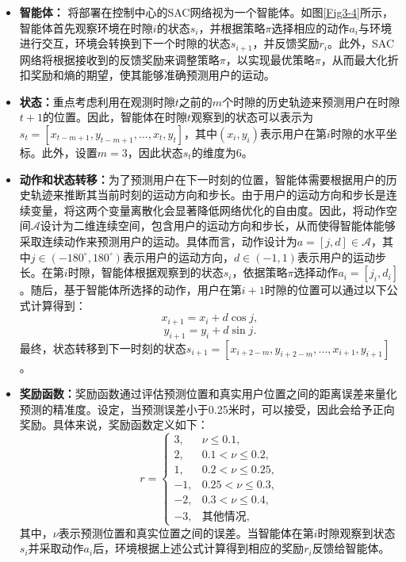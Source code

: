 \documentclass{article}
\begin{document}
\begin{itemize} 
	\item \textbf{智能体：}  将部署在控制中心的SAC网络视为一个智能体。如图\ref{Fig3-4}所示，智能体首先观察环境在时隙$i$的状态$s_i$，并根据策略$\pi$选择相应的动作$a_i$与环境进行交互，环境会转换到下一个时隙的状态$s_{i+1}$，并反馈奖励$r_i$。此外，SAC网络将根据接收到的反馈奖励来调整策略$\pi$，以实现最优策略$\pi$，从而最大化折扣奖励和熵的期望，使其能够准确预测用户的运动。
	\item \textbf{状态：}重点考虑利用在观测时隙$t$之前的$m$个时隙的历史轨迹来预测用户在时隙$t+1$的位置。因此，智能体在时隙$t$观察到的状态可以表示为$s_t = \left[x_{t-m+1}, y_{t-m+1}, \dots, x_t, y_t \right]$，其中$(x_i, y_i)$表示用户在第$i$时隙的水平坐标。此外，设置$m = 3$，因此状态$s_t$的维度为6。
	\item \textbf{动作和状态转移：}为了预测用户在下一时刻的位置，智能体需要根据用户的历史轨迹来推断其当前时刻的运动方向和步长。由于用户的运动方向和步长是连续变量，将这两个变量离散化会显著降低网络优化的自由度。因此，将动作空间$\mathcal{A}$设计为二维连续空间，包含用户的运动方向和步长，从而使得智能体能够采取连续动作来预测用户的运动。具体而言，动作设计为$a = \left[j, d\right] \in \mathcal{A}$，其中$j \in \left(-180^{\circ}, 180^{\circ}\right)$表示用户的运动方向，$d \in \left(-1, 1\right)$表示用户的运动步长。在第$i$时隙，智能体根据观察到的状态$s_i$，依据策略$\pi$选择动作$a_i = \left[j_i, d_i\right]$。随后，基于智能体所选择的动作，用户在第$i+1$时隙的位置可以通过以下公式计算得到：
	\begin{equation}\label{eq11}
		x_{i+1} = x_i+d\cos{j},   
	\end{equation}
	\begin{equation}\label{eq12}
		y_{i+1} = y_i+d\sin{j}.
	\end{equation}
	最终，状态转移到下一时刻的状态$s_{i+1} = \left[x_{i+2-m}, y_{i+2-m}, \dots, x_{i+1}, y_{i+1} \right]$。
	\item \textbf{奖励函数：}奖励函数通过评估预测位置和真实用户位置之间的距离误差来量化预测的精准度。设定，当预测误差小于0.25米时，可以接受，因此会给予正向奖励。具体来说，奖励函数定义如下：
	\begin{equation}\label{eq3-14}
		r=\begin{cases}3,& \nu\le0.1,\\
			2,& 0.1<\nu\le0.2,\\
			1,& 0.2<\nu\le0.25,\\
			-1,& 0.25<\nu\le0.3,\\
			-2,& 0.3<\nu\le0.4,\\
			-3,& \text{其他情况},
		\end{cases}
	\end{equation}
	其中，$\nu$表示预测位置和真实位置之间的误差。当智能体在第$i$时隙观察到状态$s_i$并采取动作$a_i$后，环境根据上述公式计算得到相应的奖励$r_i$反馈给智能体。
\end{itemize}
\end{document}
